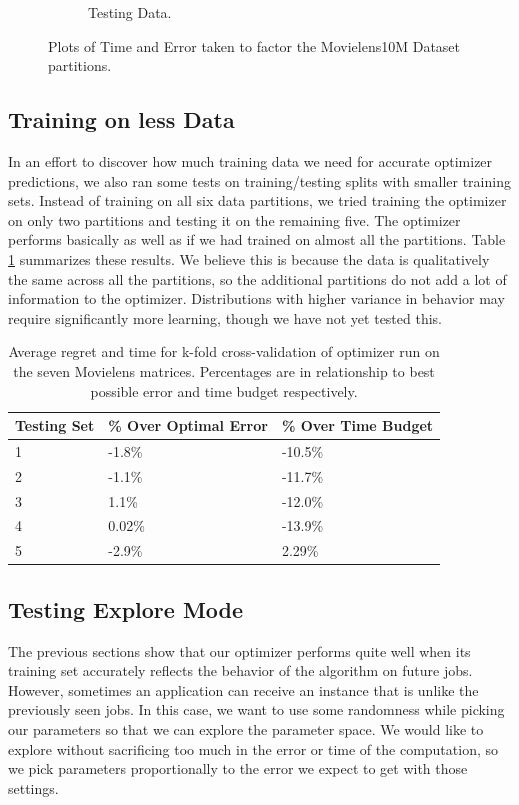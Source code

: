 \begin{figure}
\begin{subfigure}[b]{.45\textwidth}
\begin{center}
		\caption{Testing Data. }
\end{center}
	\end{subfigure}
\hfill
	\caption{Plots of Time and Error taken to factor the Movielens10M Dataset partitions.}	
\end{figure}

\subsection{Training on less Data}
In an effort to discover how much training data we need for accurate optimizer predictions, we also ran some tests on training/testing splits with smaller training sets. Instead of training on all six data partitions, we tried training the optimizer on only two partitions and testing it on the remaining five. The optimizer performs basically as well as if we had trained on almost all the partitions. Table \ref{fig:MovieTrain2Table} summarizes these results. We believe this is because the data is qualitatively the same across all the partitions, so the additional partitions do not add a lot of information to the optimizer. Distributions with higher variance in behavior may require significantly more learning, though we have not yet tested this. 

\begin{table}
\label{fig:MovieTrain2Table}
\begin{center}
    \begin{tabular}{| p{2.2cm} | p{2.2cm} | p{2.2cm} |}
    \hline
    Testing Set & \% Over Optimal Error & \% Over Time Budget \\ \hline
    1 & -1.8\% & -10.5\% \\ \hline
    2 & -1.1\% & -11.7\% \\ \hline
    3 & 1.1\% & -12.0\% \\ \hline
    4 & 0.02\% & -13.9\% \\ \hline
    5 & -2.9\% & 2.29\% \\ \hline
    \end{tabular}
\end{center}
\caption{Average regret and time for k-fold cross-validation of optimizer run on the seven Movielens matrices. Percentages are in relationship to best possible error and time budget respectively.}
\end{table}

\subsection{Testing Explore Mode}
\label{sec:estEval}
The previous sections show that our optimizer performs quite well when its training set accurately reflects the behavior of the algorithm on future jobs. However, sometimes an application can receive an instance that is unlike the previously seen jobs. In this case, we want to use some randomness while picking our parameters so that we can explore the parameter space. We would like to explore without sacrificing too much in the error or time of the computation, so we pick parameters proportionally to the error we expect to get with those settings. 

